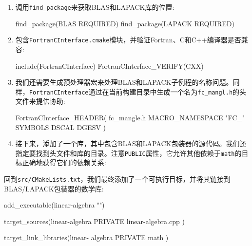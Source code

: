 \begin{enumerate}
\item 调用\texttt{find\_package}来获取BLAS和LAPACK库的位置:

\begin{codebox}[cmake]
find_package(BLAS REQUIRED)
find_package(LAPACK REQUIRED)
\end{codebox}

\item 包含\texttt{FortranCInterface.cmake}模块，并验证Fortran、C和C++编译器是否兼容:

\begin{codebox}[cmake]
include(FortranCInterface)
FortranCInterface_VERIFY(CXX)
\end{codebox}

\item 我们还需要生成预处理器宏来处理BLAS和LAPACK子例程的名称问题。同样，\texttt{FortranCInterface}通过在当前构建目录中生成一个名为\texttt{fc\_mangl.h}的头文件来提供协助:

\begin{codebox}[cmake]
FortranCInterface_HEADER(
  fc_mangle.h
  MACRO_NAMESPACE "FC_"
  SYMBOLS DSCAL DGESV
  )
\end{codebox}

\item 接下来，添加了一个库，其中包含BLAS和LAPACK包装器的源代码。我们还指定要找到头文件和库的目录。注意\texttt{PUBLIC}属性，它允许其他依赖于\texttt{math}的目标正确地获得它们的依赖关系:


\end{enumerate}

回到\texttt{src/CMakeLists.txt}，我们最终添加了一个可执行目标，并将其链接到BLAS/LAPACK包装器的数学库:

\begin{codebox}[cmake]
add_executable(linear-algebra "")

target_sources(linear-algebra
  PRIVATE
    linear-algebra.cpp
  )

target_link_libraries(linear- algebra
  PRIVATE
    math
  )
\end{codebox}

